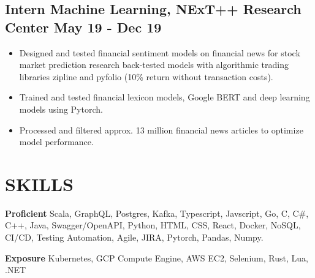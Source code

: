 \documentclass[9pts]{article}
\begin{document}
\subsection*{ Intern Machine Learning, NExT++ Research Center \href{https://github.com/GelliFrancesco/assetpriceprediction}{\faGithub} \hfill May 19 - Dec 19}
\begin{itemize}
    \item Designed and tested financial sentiment models on financial news for stock market prediction research back-tested models with algorithmic trading libraries zipline and pyfolio (10\% return without transaction costs).
    \item Trained and tested financial lexicon models, Google BERT and deep learning models using Pytorch.
    \item Processed and filtered approx. 13 million financial news articles to optimize model performance.
\end{itemize}

\section*{SKILLS}
{\large \bf Proficient}
Scala, GraphQL, Postgres, Kafka, Typescript, Javscript, Go, C, C\#, C++, Java,
Swagger/OpenAPI, Python, HTML, CSS, React, Docker, NoSQL, CI/CD, Testing
Automation, Agile, JIRA, Pytorch, Pandas, Numpy.

{\large \bf Exposure}
Kubernetes, GCP Compute Engine, AWS EC2, Selenium, Rust, Lua, .NET
\end{document}
